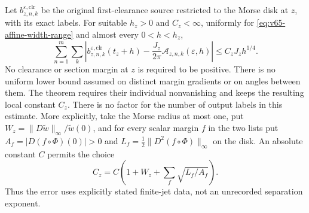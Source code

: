 \begin{theorem}
\label{thm:v65-affine-label-profile}
Let $b_{z,n,k}^{\varepsilon,\mathrm{clr}}$ be the original
first-clearance source restricted to the Morse disk at $z$, with
its exact labels. For suitable $h_z>0$ and $C_z<\infty$, uniformly
for \eqref{eq:v65-affine-width-range} and almost every $0<h<h_z$,
\begin{equation}\label{eq:v65-affine-label-error}
 \sum_{n=1}^m\sum_k
 \left|b_{z,n,k}^{\varepsilon,\mathrm{clr}}(t_z+h)
       -\frac{J_z}{2\pi}\mathcal A_{z,n,k}(\varepsilon,h)\right|
                         \le C_zJ_z h^{1/4}.
\end{equation}
No clearance or section margin at $z$ is required to be positive.
There is no uniform lower bound assumed on distinct margin gradients
or on angles between them. The theorem requires their individual
nonvanishing and keeps the resulting local constant $C_z$.
There is no factor for the number of output labels in this estimate.
More explicitly, take the Morse radius at most one, put
$W_z=\|D\widetilde w\|_\infty/\widetilde w(0)$, and for every scalar
margin $f$ in the two lists put
$A_f=|D(f\circ\Phi)(0)|>0$ and
$L_f=\tfrac12\|D^2(f\circ\Phi)\|_\infty$ on the disk.
An absolute constant $C$ permits the choice
\begin{equation}\label{eq:v65-jet-budget}
 C_z=C\left(1+W_z+\sum_f\sqrt{L_f/A_f}\right).
\end{equation}
Thus the error uses explicitly stated finite-jet data, not an
unrecorded separation exponent.
\end{theorem}
